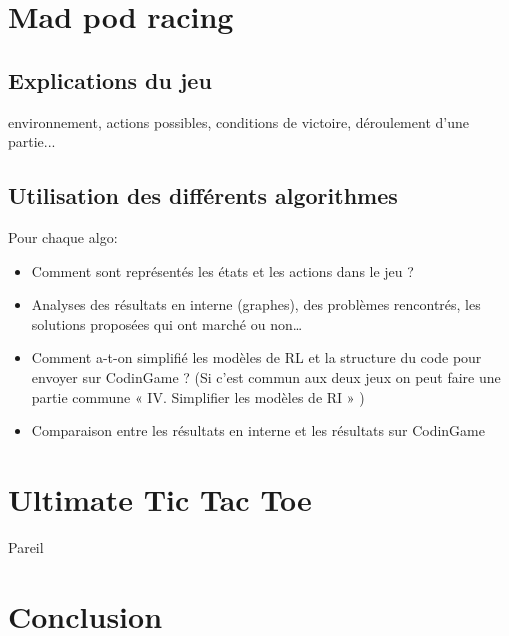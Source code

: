 \documentclass{article}
\begin{document}
\section{Mad pod racing}
\subsection{Explications du jeu}
environnement, actions possibles, conditions de victoire, déroulement d’une partie...

\subsection{Utilisation des différents algorithmes}
Pour chaque algo:
\begin{itemize}
\item Comment sont représentés les états et les actions dans le jeu ?

\item Analyses des résultats en interne (graphes), des problèmes rencontrés, les solutions proposées qui ont marché ou non…

\item Comment a-t-on simplifié les modèles de RL et la structure du code pour envoyer sur CodinGame ? (Si c’est commun aux deux jeux on peut faire une partie commune « IV. Simplifier les modèles de RI » )

\item	Comparaison entre les résultats en interne et les résultats sur CodinGame
\end{itemize}


\section{Ultimate Tic Tac Toe}
Pareil


\section{Conclusion}


\nocite{*}
\printbibliography 
\end{document}
